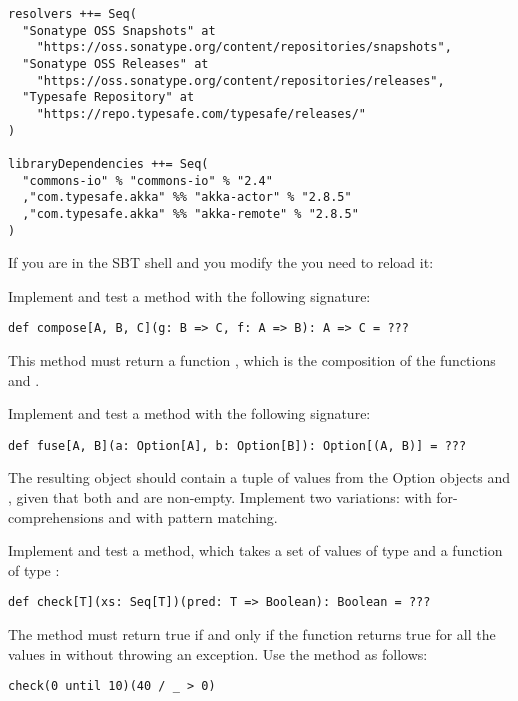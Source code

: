 \documentclass[11pt]{article}
\begin{document}
\begin{myExercise}
\begin{lstlisting}
resolvers ++= Seq(
  "Sonatype OSS Snapshots" at
    "https://oss.sonatype.org/content/repositories/snapshots",
  "Sonatype OSS Releases" at
    "https://oss.sonatype.org/content/repositories/releases",
  "Typesafe Repository" at
    "https://repo.typesafe.com/typesafe/releases/"
)

libraryDependencies ++= Seq(
  "commons-io" % "commons-io" % "2.4"
  ,"com.typesafe.akka" %% "akka-actor" % "2.8.5"
  ,"com.typesafe.akka" %% "akka-remote" % "2.8.5"
)
\end{lstlisting}
If you are in the SBT shell and you modify the  you need to reload it:
\\

\end{myExercise}

\begin{myExercise}
Implement and test a  method with the following signature:
\begin{lstlisting}
def compose[A, B, C](g: B => C, f: A => B): A => C = ???
\end{lstlisting}
This method must return a function , which is the composition of the
functions  and .
\end{myExercise}

\begin{myExercise}
Implement and test a  method with the following signature:
\begin{lstlisting}
def fuse[A, B](a: Option[A], b: Option[B]): Option[(A, B)] = ???
\end{lstlisting}
The resulting  object should contain a tuple of values from the Option objects  and , given that both  and  are non-empty. Implement two variations: with for-comprehensions and with pattern matching.
\end{myExercise}

\begin{myExercise}
Implement and test a  method, which takes a set of values of type  and a function of type :
\begin{lstlisting}
def check[T](xs: Seq[T])(pred: T => Boolean): Boolean = ???
\end{lstlisting}
The method must return true if and only if the  function returns true for all the values in  without throwing an exception. Use the  method as follows:
\begin{lstlisting}
check(0 until 10)(40 / _ > 0)
\end{lstlisting}
\end{myExercise}
\end{document}
